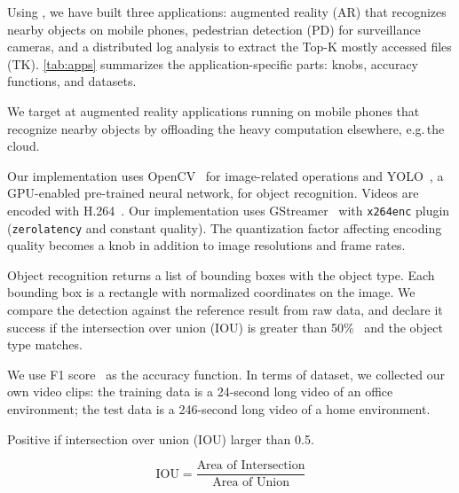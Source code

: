 Using \sysname{}, we have built three applications: augmented reality (AR) that
recognizes nearby objects on mobile phones, pedestrian detection (PD) for
surveillance cameras, and a distributed log analysis to extract the Top-K mostly
accessed files (TK). \autoref{tab:apps} summarizes the application-specific
parts: knobs, accuracy functions, and datasets.

 We target at augmented reality applications running on
mobile phones that recognize nearby objects by offloading the heavy computation
elsewhere, e.g.\,the cloud.

Our implementation uses OpenCV~\cite{opencvlibrary} for image-related operations
and YOLO~\cite{darknet13, redmon2016yolo9000}, a GPU-enabled pre-trained neural
network, for object recognition. Videos are encoded with
H.264~\cite{richardson2011h}. Our implementation uses GStreamer~\cite{gstreamer}
with \texttt{x264enc} plugin (\texttt{zerolatency} and constant quality). The
quantization factor affecting encoding quality becomes a knob in addition to
image resolutions and frame rates.

Object recognition returns a list of bounding boxes with the object type. Each
bounding box is a rectangle with normalized coordinates on the image. We compare
the detection against the reference result from raw data, and declare it success
if the intersection over union (IOU) is greater than
50\%~\cite{everingham2010pascal} and the object type matches.

We use F1 score~\cite{van1979information} as the accuracy function. In terms of
dataset, we collected our own video clips: the training data is a 24-second long
video of an office environment; the test data is a 246-second long video of a
home environment.

Positive if intersection over union (IOU) larger than 0.5.

\[
  \text{IOU} = \frac{\text{Area of Intersection}}{\text{Area of Union}}
\]

